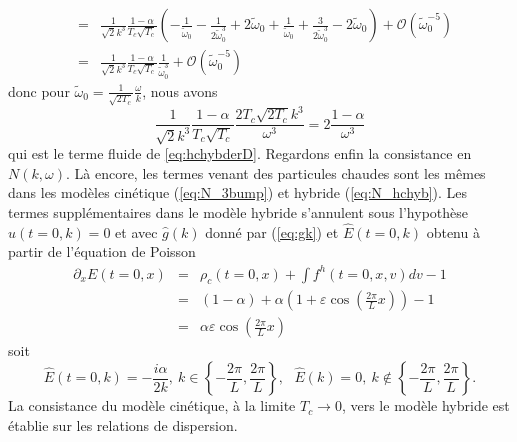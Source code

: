 {\begin{eqnarray*}
  &=&\frac{1}{\sqrt{2}k^3}\frac{1-\alpha}{T_c\sqrt{T_c}}\left(-\frac{1}{\tilde{\omega}_0}-\frac{1}{2\tilde{\omega}_0^3}+2\tilde{\omega}_0+\frac{1}{\tilde{\omega}_0}+\frac{3}{2\tilde{\omega}_0^3}-2\tilde{\omega}_0\right)+\mathcal{O}\left(\tilde{\omega}_0^{-5}\right)\\
  &=&\frac{1}{\sqrt{2}k^3}\frac{1-\alpha}{T_c\sqrt{T_c}}\frac{1}{\tilde{\omega}_0^3}+\mathcal{O}\left(\tilde{\omega}_0^{-5}\right)
\end{eqnarray*}
donc pour $\tilde{\omega}_0=\frac{1}{\sqrt{2T_c}}\frac{\omega}{k}$, nous avons 
$$
  \frac{1}{\sqrt{2}k^3}\frac{1-\alpha}{T_c\sqrt{T_c}}\frac{2T_c\sqrt{2T_c}k^3}{\omega^3}=2\frac{1-\alpha}{\omega^3}
$$
qui est le terme fluide de \eqref{eq:hchybderD}.
Regardons enfin la consistance en $N(k,\omega)$. Là encore, les termes venant des particules chaudes sont les mêmes dans les modèles cinétique (\ref{eq:N_3bump}) et hybride (\ref{eq:N_hchyb}). Les termes supplémentaires dans le modèle hybride s'annulent sous l'hypothèse $\hat{u}(t=0,k)=0$ et avec $\hat{g}(k)$ donné par (\ref{eq:gk}) et $\hat{E}(t=0,k)$ obtenu à partir de l'équation de Poisson 
\begin{eqnarray*}
  \partial_xE(t=0,x)&=& \rho_c(t=0,x)+\int f^h(t=0,x,v)dv-1\\
                    &=& \left(1-\alpha\right)+\alpha\left(1+\varepsilon\cos\left(\frac{2\pi}{L}x\right)\right)-1\\
                    &=& \alpha\varepsilon\cos\left(\frac{2\pi}{L}x\right)
\end{eqnarray*}
soit
\begin{equation}
  \hat{E}\left(t=0,k\right)=-\frac{i\alpha}{2k},~k\in\left\{-\frac{2\pi}{L},\frac{2\pi}{L}\right\},~~~\hat{E}(k)=0,~k\notin\left\{-\frac{2\pi}{L},\frac{2\pi}{L}\right\}.
\label{eq:Ekbis}
\end{equation}
La consistance du modèle cinétique, à la limite $T_c\to 0$, vers le modèle hybride est établie sur les relations de dispersion.} 

